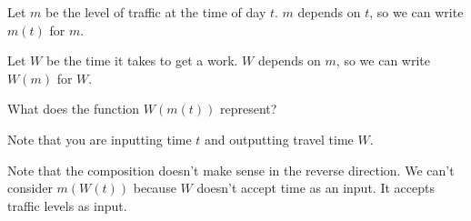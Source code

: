 \documentclass{ximera}
\begin{document}
\begin{question}
Let $m$ be the level of traffic at the time of day $t$. $m$ depends on $t$, so we can write $m(t)$ for $m$.

Let $W$ be the time it takes to get a work. $W$ depends on $m$, so we can write $W(m)$ for $W$.

What does the function $W(m(t))$ represent?

\begin{multipleChoice}
\end{multipleChoice}
\begin{hint}
Note that you are inputting time $t$ and outputting travel time $W$. 
\end{hint}

Note that the composition doesn't make sense in the reverse direction. We can't consider $m(W(t))$ because $W$ doesn't accept time as an input. It accepts traffic levels as input.

\end{question}
\end{document}
